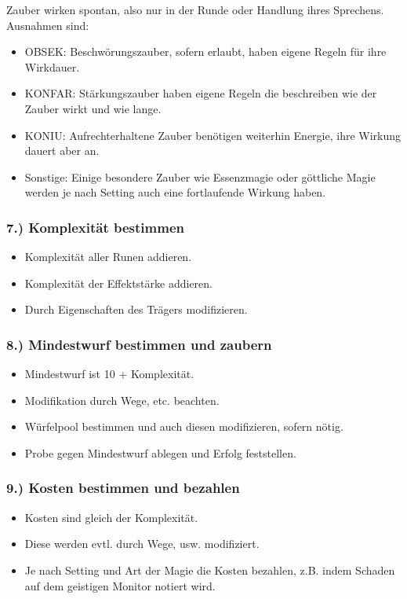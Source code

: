 \documentclass{article}
\begin{document}
Zauber wirken spontan, also nur in der Runde oder Handlung ihres Sprechens. Ausnahmen sind:

\begin{itemize}
\item OBSEK: Beschwörungszauber, sofern erlaubt, haben eigene Regeln für ihre Wirkdauer.
\item KONFAR: Stärkungszauber haben eigene Regeln die beschreiben wie der Zauber wirkt und wie lange.
\item KONIU: Aufrechterhaltene Zauber benötigen weiterhin Energie, ihre Wirkung dauert aber an.
\item Sonstige: Einige besondere Zauber wie Essenzmagie oder göttliche Magie werden je nach Setting auch eine fortlaufende Wirkung haben.
\end{itemize}

\subsubsection{7.) Komplexität bestimmen}

\begin{itemize}
\item Komplexität aller Runen addieren.
\item Komplexität der Effektstärke addieren.
\item Durch Eigenschaften des Trägers modifizieren.
\end{itemize}

\subsubsection{8.) Mindestwurf bestimmen und zaubern}

\begin{itemize}
\item Mindestwurf ist 10 + Komplexität.
\item Modifikation durch Wege, etc. beachten.
\item Würfelpool bestimmen und auch diesen modifizieren, sofern nötig.
\item Probe gegen Mindestwurf ablegen und Erfolg feststellen.
\end{itemize}

\subsubsection{9.) Kosten bestimmen und bezahlen}

\begin{itemize}
\item Kosten sind gleich der Komplexität.
\item Diese werden evtl. durch Wege, usw. modifiziert.
\item Je nach Setting und Art der Magie die Kosten bezahlen, z.B. indem Schaden auf dem geistigen Monitor notiert wird.
\end{itemize}
\end{document}
